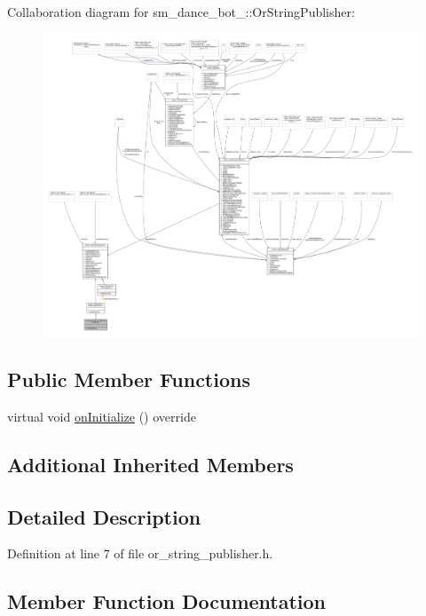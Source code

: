 Collaboration diagram for sm\+\_\+dance\+\_\+bot\+\_\+:\+:Or\+String\+Publisher\+:
\nopagebreak
\begin{figure}[H]
\begin{center}
\leavevmode
\includegraphics[width=350pt]{classsm__dance__bot__2_1_1OrStringPublisher__coll__graph}
\end{center}
\end{figure}
\subsection*{Public Member Functions}
\begin{DoxyCompactItemize}
\item 
virtual void \hyperlink{classsm__dance__bot__2_1_1OrStringPublisher_a2c3841b1eecf31ecd86cc44db1b62fc2}{on\+Initialize} () override
\end{DoxyCompactItemize}
\subsection*{Additional Inherited Members}


\subsection{Detailed Description}


Definition at line 7 of file or\+\_\+string\+\_\+publisher.\+h.



\subsection{Member Function Documentation}
\mbox{\label{classsm__dance__bot__2_1_1OrStringPublisher_a2c3841b1eecf31ecd86cc44db1b62fc2}} 
